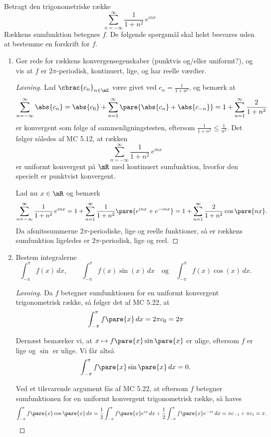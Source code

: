 \begin{opg}
Betragt den trigonometriske række
$$
\sum_{n=-\infty}^\infty\frac1{1+n^2}\,e^{inx}
$$
Rækkens sumfunktion betegnes $f$. De følgende spørgsmål skal helst besvares uden at bestemme en forskrift for $f$.
\begin{enumerate}
\item Gør rede for rækkens konvergensegenskaber (punktvis og/eller uniformt?), 
og vis at $f$ er $2\pi$-periodisk, kontinuert, lige, og har reelle værdier.

\begin{proof}[Løsning]
Lad $\cbrac{c_n}_{n\in\mZ}$ være givet ved $c_n = \frac{1}{1+n^2}$, og bemærk at
$$ \sum_{n=-\infty}^\infty \abs{c_n}
    = \abs{c_0} + \sum_{n=1}^\infty \pare{\abs{c_n}+\abs{c_{-n}}} 
    = 1 + \sum_{n=1}^\infty \frac{2}{1+n^2} $$
er konvergent som følge af sammenligningstesten, eftersom $\frac{1}{1+n^2}\leq \frac{1}{n^2}$. Det følger således af MC 5.12, at rækken
$$ \sum_{n=-\infty}^\infty\frac1{1+n^2}\,e^{inx} $$
er uniformt konvergent på $\mR$ med kontinuert sumfunktion, hvorfor den specielt er punktvist konvergent.

Lad nu $x\in\mR$ og bemærk
$$ \sum_{n=-\infty}^\infty\frac1{1+n^2}\,e^{inx}
    = 1 + \sum_{n=1}^\infty \frac{1}{1+n^2}\pare{e^{inx} + e^{-inx}} 
    = 1 + \sum_{n=1}^\infty \frac{2}{1+n^2}\cos\pare{nx}. $$
Da afsnitssummerne $2\pi$-periodiske, lige og reelle funktioner, så er rækkens sumfunktion ligeledes er $2\pi$-periodisk, lige og reel. 
\end{proof}

\item Bestem integralerne 
$$ \int_{-\pi}^\pi f(x)\,dx,\quad\quad \int_{-\pi}^\pi f(x)\sin(x)\,dx \quad \text{og}\quad \int_{-\pi}^\pi  f(x)\cos(x)\,dx . $$

\begin{proof}[Løsning]
Da $f$ betegner sumfunktionen for en uniformt konvergent trigonometrisk række, så følger det af MC 5.22, at
$$ \int_{-\pi}^\pi f\pare{x} \, dx = 2\pi c_0 = 2\pi $$

Dernæst bemærker vi, at $x\mapsto f\pare{x}\sin\pare{x}$ er ulige, eftersom $f$ er lige og $\sin$ er ulige. Vi får altså
$$ \int_{-\pi}^\pi f\pare{x}\sin\pare{x} \, dx = 0. $$

Ved et tilsvarende argument fås af MC 5.22, at eftersom $f$ betegner sumfunktionen for en uniformt konvergent trigonometrisk række, så haves
$$ \int_{-\pi}^\pi f\pare{x}\cos\pare{x} \, dx 
    = \frac{1}{2}\int_{-\pi}^\pi f\pare{x}e^{ix} \, dx 
        + \frac{1}{2}\int_{-\pi}^\pi f\pare{x}e^{-ix} \, dx 
    = \pi c_{-1} + \pi c_1 = \pi. $$
\end{proof}
\end{enumerate}
\end{opg}

